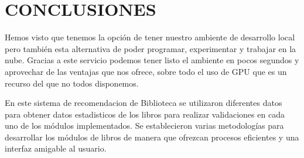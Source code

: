 \section{CONCLUSIONES} 


Hemos visto que tenemos la opción de tener nuestro ambiente de desarrollo local pero también esta alternativa de poder programar, experimentar y trabajar en la nube. Gracias a este servicio podemos tener listo el ambiente en pocos segundos y aprovechar de las ventajas que nos ofrece, sobre todo el uso de GPU que es un recurso del que no todos disponemos. 

En este sistema de recomendacion de Biblioteca se utilizaron diferentes datos para obtener datos estadisticos de los libros para realizar validaciones en cada uno de los módulos implementados. 
Se establecieron varias metodologías para desarrollar los módulos de libros de manera que ofrezcan procesos eficientes y una interfaz amigable al usuario.

